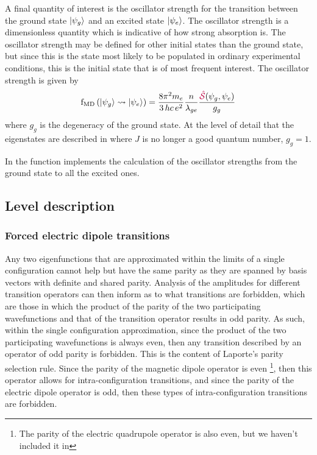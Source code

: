 \documentclass[11pt, twoside,openright]{article}
\begin{document}
 
 
A final quantity of interest is the oscillator strength for the transition between the ground state $|\psi_g\rangle$ and an excited state $|\psi_e\rangle$. The oscillator strength is a dimensionless quantity which is indicative of how strong absorption is. The oscillator strength may be defined for other initial states than the ground state, but since this is the state most likely to be populated in ordinary experimental conditions, this is the initial state that is of most frequent interest. The oscillator strength is given by \cite{carnall_spectral_1965}
\begin{equation}
	\text{f}_\text{MD}\left(|\psi_g\rangle \rightsquigarrow |\psi_e\rangle\right) = \frac{8 \pi^2 m_{e}}{3\,hc\,e^2} 
	\frac{n}{\lambda_{ge}}
	\frac{\textcolor{purple}{\hat{\mathcal{S}}}(\psi_g,\psi_e)}{g_g}
\end{equation}
where $g_g$ is the degeneracy of the ground state. At the level of detail that the eigenstates are described in \qlanth where $J$ is no longer a good quantum number, $g_g = 1$. 

In \qlanth the function  implements the calculation of the oscillator strengths from the ground state to all the excited ones.

 

\subsection{Level description}

\subsubsection{Forced electric dipole transitions}

Any two eigenfunctions that are approximated within the limits of a single configuration cannot help but have the same parity as they are spanned by basis vectors with definite and shared parity. Analysis of the amplitudes for different transition operators can then inform as to what transitions are forbidden, which are those in which the product of the parity of the two participating wavefunctions and that of the transition operator results in odd parity. As such, within the single configuration approximation, since the product of the two participating wavefunctions is always even, then any transition described by an operator of odd parity is forbidden. This is the content of  Laporte's parity selection rule. Since the parity of the magnetic dipole operator is even \footnote{The parity of the electric quadrupole operator is also even, but we haven't included it in \qlanth}, then this operator allows for  intra-configuration transitions, and since the parity of the electric dipole operator is odd, then these types of intra-configuration transitions are forbidden.
\end{document}
